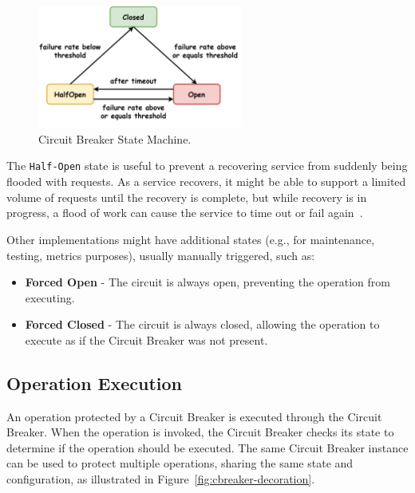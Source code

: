 \begin{figure}[!htb]
    \centering
    \includegraphics[width=0.6\textwidth]{../figures/05_cbreaker-states}
    \caption{Circuit Breaker State Machine.}
    \label{fig:circuit-breaker-state-machine}
\end{figure}

The \texttt{Half-Open} state is useful to prevent a recovering service from suddenly being flooded with requests.
As a service recovers, it might be able to support a limited volume of requests until the recovery is complete,
but while recovery is in progress, a flood of work can cause the service
to time out or fail again~\cite{microsoft-cbreaker-pattern}.

Other implementations might have additional states (e.g., for maintenance, testing, metrics purposes), usually manually triggered, such as:

\begin{itemize}
    \item \textbf{Forced Open} - The circuit is always open, preventing the operation from executing.
    \item \textbf{Forced Closed} - The circuit is always closed, allowing the operation to execute as if the Circuit Breaker was not present.
\end{itemize}

\subsection{Operation Execution}\label{subsec:cbreaker-operation-execution}

An operation protected by a Circuit Breaker is executed through the Circuit Breaker.
When the operation is invoked, the Circuit Breaker checks its state to determine if the operation should be executed.
The same Circuit Breaker instance can be used to protect multiple operations, sharing the same state and configuration, as illustrated in Figure~\ref{fig:cbreaker-decoration}.

